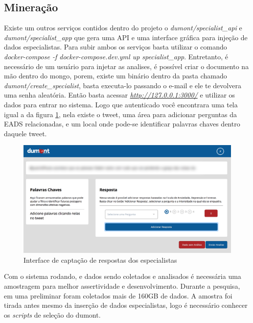 \subsection{Mineração}

Existe um outros serviços contidos dentro do projeto o \textit{dumont/specialist\_api} e \textit{dumont/specialist\_app} que gera uma API e uma interface gráfica para injeção de dados especialistas. Para subir ambos os serviços basta utilizar o comando \textit{docker-compose -f docker-compose.dev.yml up specialist\_app}. Entretanto, é necessário de um usuário para injetar as analises, é possível criar o documento na mão dentro do mongo, porem, existe um binário dentro da pasta chamado \textit{dumont/create\_specialist}, basta executa-lo passando o e-mail e ele te devolvera uma senha aleatória. Então basta acessar \textit{\url{http://127.0.0.1:3000/}} e utilizar os dados para entrar no sistema. Logo que autenticado você encontrara uma tela igual a da figura \ref{fig:specialist}, nela existe o tweet, uma área para adicionar perguntas da EADS relacionadas, e um local onde pode-se identificar palavras chaves dentro daquele tweet.

\begin{figure}
    \centering
    \includegraphics[width=1\textwidth]{imagens/specialist.png}
    \caption{Interface de captação de respostas dos especialistas}
    \label{fig:specialist}
\end{figure}

Com o sistema rodando, e dados sendo coletados e analisados é necessária uma amostragem para melhor assertividade e desenvolvimento. Durante a pesquisa, em uma preliminar foram coletados mais de 160GB de dados. A amostra foi tirada antes mesmo da inserção de dados especialistas, logo é necessário conhecer os \textit{scripts} de seleção do dumont.
